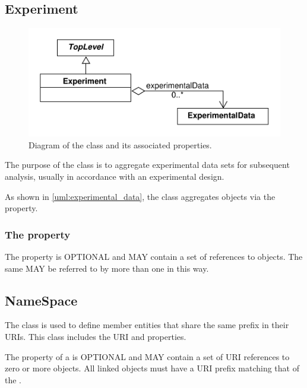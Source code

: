 \subsection{Experiment}
\label{sec:Experiment}


\begin{figure}[ht]
\begin{center}
\includegraphics[scale=0.6]{uml/experiment}
\caption[]{Diagram of the  class and its associated properties.}
\label{uml:experiment}
\end{center}
\end{figure}

The purpose of the  class is to aggregate experimental data sets for subsequent analysis, usually in accordance with an experimental design. 

As shown in \ref{uml:experimental_data}, the  class aggregates  objects via the  property.

\subsubsection*{ The  property}\label{sec:experimentalData}
The  property is OPTIONAL and MAY contain a set of  references to  objects. The same  MAY be referred to by more than one  in this way.

\subsection{NameSpace}
\label{sec:NameSpace}
The  class is used to define member entities that share the same prefix in their URIs. This class includes the URI and  properties. 

The  property of a  is OPTIONAL and MAY contain a set of URI references to zero or more  objects. All linked objects must have a URI prefix matching that of the . 

